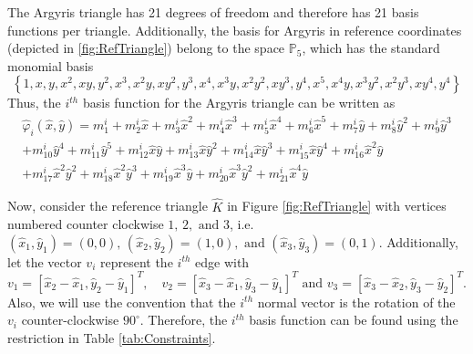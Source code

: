 

The Argyris triangle has 21 degrees of freedom and therefore has 21 basis functions per triangle.
Additionally, the basis for Argyris in reference coordinates (depicted in \autoref{fig:RefTriangle})
belong to the space $\mathbb{P}_5$, which has the standard monomial basis
\begin{equation*}
	\left\{
    1, x, y, x^2, xy, y^2, x^3, x^2y, xy^2, y^3, x^4, x^3y, 
    x^2y^2, xy^3, y^4, x^5, x^4y, x^3y^2, x^2y^3, xy^4, y^4 
  \right\}
\end{equation*}
Thus, the $i^{th}$ basis function for the Argyris triangle can be written as 
\begin{equation}
	\begin{split}
	\hat{\varphi}_i(\hat{x},\hat{y}) = m^i_1 + m^i_2 \hat{x} + m^i_3 \hat{x}^2 + m^i_4 \hat{x}^3 + m^i_5 \hat{x}^4 + m^i_6 \hat{x}^5 + m^i_7 \hat{y} + m^i_8
 	\hat{y}^2 + m^i_9 \hat{y}^3 \\
 + m^i_{10} \hat{y}^4 + m^i_{11} \hat{y}^5 + m^i_{12}  \hat{x} \hat{y} + m^i_{13} \hat{x} \hat{y}^2 + m^i_{14} \hat{x} \hat{y}^3 + m^i_{15}
 	\hat{x} \hat{y}^4 + m^i_{16} \hat{x}^2 \hat{y} \\ 
 + m^i_{17} \hat{x}^2 \hat{y}^2 + m^i_{18}\hat{x}^2 \hat{y}^3 + m^i_{19} \hat{x}^3 \hat{y} + m^i_{20}\hat{x}^3 \hat{y}^2 + m^i_{21} \hat{x}^4 \hat{y}
 \end{split}
	\label{eqn:Basis}
\end{equation}

Now, consider the reference triangle $\hat{K}$ in Figure \ref{fig:RefTriangle} with
vertices numbered counter clockwise $1,\, 2,\text{ and } 3$, i.e.
$(\hat{x}_1,\hat{y}_1)=(0,0),\, (\hat{x}_2,\hat{y}_2)=(1,0),\text{ and } (\hat{x}_3,\hat{y}_3)=(0,1)$.
Additionally, let the vector $v_i$ represent the $i^{th}$ edge with
\begin{equation*}
  v_1 = [\hat{x}_2-\hat{x}_1,\hat{y}_2-\hat{y}_1]^T, \quad v_2=[\hat{x}_3-\hat{x}_1,\hat{y}_3-\hat{y}_1]^T \text{ and } v_3=[\hat{x}_3
  -\hat{x}_2,\hat{y}_3-\hat{y}_2]^T.
\end{equation*}
Also, we will use the convention that the $i^{th}$ normal vector is the rotation
of the $v_i$ counter-clockwise $90^\circ$. Therefore, the $i^{th}$ basis
function can be found using the restriction in Table \ref{tab:Constraints}.

